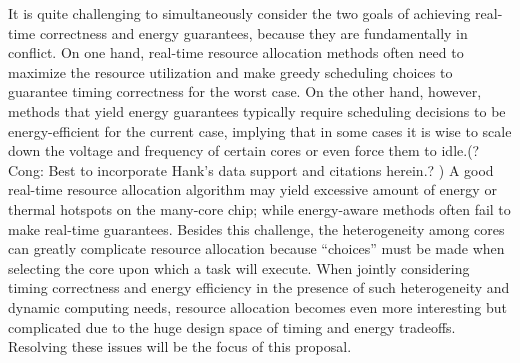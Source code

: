 It is quite challenging to simultaneously consider the two goals of achieving real-time correctness and energy guarantees, because they are fundamentally in conflict. 
On one hand, real-time resource allocation methods often need to maximize the resource utilization and make greedy scheduling choices to guarantee timing correctness for the worst case. On the other hand, however, methods that yield energy guarantees typically require scheduling decisions to be energy-efficient for the current case, implying that in some cases it is wise to scale down the voltage and frequency of certain cores or even force them to idle.(?Cong: Best to incorporate Hank's data support and citations herein.? ) 
 A good real-time resource allocation algorithm may yield excessive amount of energy or thermal hotspots on the many-core chip; while energy-aware methods often fail to make real-time guarantees. %
  Besides this challenge, the heterogeneity among cores can greatly complicate resource allocation because ``choices'' must be made when selecting the core upon which a task will execute. When jointly considering timing correctness and energy efficiency in the presence of such heterogeneity and dynamic computing needs, resource allocation becomes even more interesting but complicated due to the huge design space of  timing and energy tradeoffs. Resolving these issues will be the focus of this proposal.

\vspace{-2mm}
